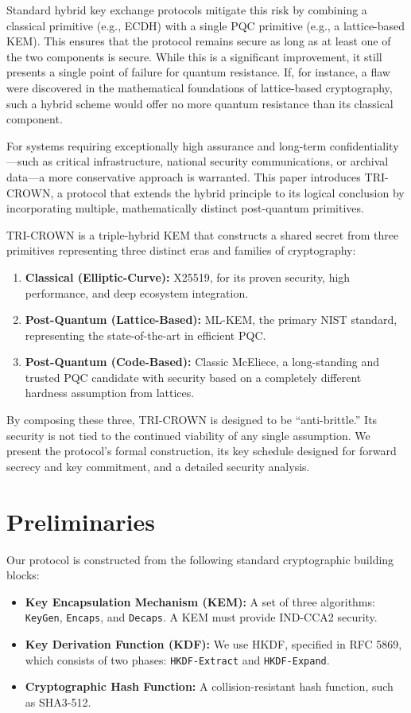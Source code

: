 \documentclass[11pt]{article}
\begin{document}
Standard hybrid key exchange protocols mitigate this risk by combining a classical primitive (e.g., ECDH) with a single PQC primitive (e.g., a lattice-based KEM). This ensures that the protocol remains secure as long as at least one of the two components is secure. While this is a significant improvement, it still presents a single point of failure for quantum resistance. If, for instance, a flaw were discovered in the mathematical foundations of lattice-based cryptography, such a hybrid scheme would offer no more quantum resistance than its classical component.

For systems requiring exceptionally high assurance and long-term confidentiality---such as critical infrastructure, national security communications, or archival data---a more conservative approach is warranted. This paper introduces TRI-CROWN, a protocol that extends the hybrid principle to its logical conclusion by incorporating multiple, mathematically distinct post-quantum primitives.

TRI-CROWN is a triple-hybrid KEM that constructs a shared secret from three primitives representing three distinct eras and families of cryptography:
\begin{enumerate}
    \item \textbf{Classical (Elliptic-Curve):} X25519, for its proven security, high performance, and deep ecosystem integration.
    \item \textbf{Post-Quantum (Lattice-Based):} ML-KEM, the primary NIST standard, representing the state-of-the-art in efficient PQC.
    \item \textbf{Post-Quantum (Code-Based):} Classic McEliece, a long-standing and trusted PQC candidate with security based on a completely different hardness assumption from lattices.
\end{enumerate}

By composing these three, TRI-CROWN is designed to be ``anti-brittle.'' Its security is not tied to the continued viability of any single assumption. We present the protocol's formal construction, its key schedule designed for forward secrecy and key commitment, and a detailed security analysis.

\section{Preliminaries}
Our protocol is constructed from the following standard cryptographic building blocks:
\begin{itemize}
    \item \textbf{Key Encapsulation Mechanism (KEM):} A set of three algorithms: \texttt{KeyGen}, \texttt{Encaps}, and \texttt{Decaps}. A KEM must provide IND-CCA2 security.
    \item \textbf{Key Derivation Function (KDF):} We use HKDF, specified in RFC 5869, which consists of two phases: \texttt{HKDF-Extract} and \texttt{HKDF-Expand}.
    \item \textbf{Cryptographic Hash Function:} A collision-resistant hash function, such as SHA3-512.
\end{itemize}
\end{document}
